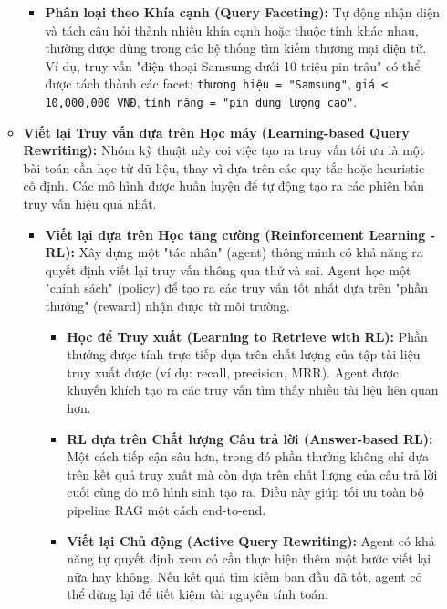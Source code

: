 \begin{itemize}
\begin{itemize}
\begin{itemize}
            \item \textbf{Phân loại theo Khía cạnh (Query Faceting):} 
            Tự động nhận diện và tách câu hỏi thành nhiều khía cạnh hoặc thuộc tính khác nhau, thường được dùng trong các hệ thống tìm kiếm thương mại điện tử. Ví dụ, truy vấn "điện thoại Samsung dưới 10 triệu pin trâu" có thể được tách thành các facet: \texttt{thương hiệu = "Samsung"}, \texttt{giá < 10,000,000 VNĐ}, \texttt{tính năng = "pin dung lượng cao"}.
        \end{itemize}
        
        \item \textbf{Viết lại Truy vấn dựa trên Học máy (Learning-based Query Rewriting):} Nhóm kỹ thuật này coi việc tạo ra truy vấn tối ưu là một bài toán cần học từ dữ liệu, thay vì dựa trên các quy tắc hoặc heuristic cố định. Các mô hình được huấn luyện để tự động tạo ra các phiên bản truy vấn hiệu quả nhất.
        \begin{itemize}
            \item \textbf{Viết lại dựa trên Học tăng cường (Reinforcement Learning - RL):} 
            Xây dựng một "tác nhân" (agent) thông minh có khả năng ra quyết định viết lại truy vấn thông qua thử và sai. Agent học một "chính sách" (policy) để tạo ra các truy vấn tốt nhất dựa trên "phần thưởng" (reward) nhận được từ môi trường.
            \begin{itemize}
                \item \textbf{Học để Truy xuất (Learning to Retrieve with RL):} 
                Phần thưởng được tính trực tiếp dựa trên chất lượng của tập tài liệu truy xuất được (ví dụ: recall, precision, MRR). Agent được khuyến khích tạo ra các truy vấn tìm thấy nhiều tài liệu liên quan hơn.
                
                \item \textbf{RL dựa trên Chất lượng Câu trả lời (Answer-based RL):} 
                Một cách tiếp cận sâu hơn, trong đó phần thưởng không chỉ dựa trên kết quả truy xuất mà còn dựa trên chất lượng của câu trả lời cuối cùng do mô hình sinh tạo ra. Điều này giúp tối ưu toàn bộ pipeline RAG một cách end-to-end.
                
                \item \textbf{Viết lại Chủ động (Active Query Rewriting):} 
                Agent có khả năng tự quyết định xem có cần thực hiện thêm một bước viết lại nữa hay không. Nếu kết quả tìm kiếm ban đầu đã tốt, agent có thể dừng lại để tiết kiệm tài nguyên tính toán.
                

\end{itemize}
\end{itemize}
\end{itemize}
\end{itemize}
